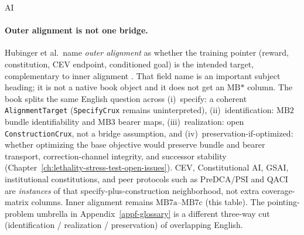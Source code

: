 \begin{authbar}{AI}
\paragraph{Outer alignment is not one bridge.}
Hubinger et al.\ name \emph{outer alignment} as whether the training pointer (reward, constitution, CEV endpoint, conditioned goal) is the intended target, complementary to inner alignment \autocite{hubinger2019risks}.
That field name is an important subject heading; it is not a native book object and it does not get an \(\text{MB*}\) column.
The book splits the same English question across (i)~specify: a coherent \texttt{AlignmentTarget} (\texttt{SpecifyCrux} remains uninterpreted), (ii)~identification: \(\text{MB2}\) bundle identifiability and \(\text{MB3}\) bearer maps, (iii)~realization: open \texttt{ConstructionCrux}, not a bridge assumption, and (iv)~preservation-if-optimized: whether optimizing the base objective would preserve bundle and bearer transport, correction-channel integrity, and successor stability (Chapter~\ref{ch:lethality-stress-test-open-issues}).
CEV, Constitutional AI, GSAI, institutional constitutions, and peer protocols such as PreDCA/PSI and QACI are \emph{instances} of that specify-plus-construction neighborhood, not extra coverage-matrix columns.
Inner alignment remains \(\text{MB7a}\)--\(\text{MB7c}\) (this table).
The pointing-problem umbrella in Appendix~\ref{appf-glossary} is a different three-way cut (identification / realization / preservation) of overlapping English.

\end{authbar}
\authbarneedspace
